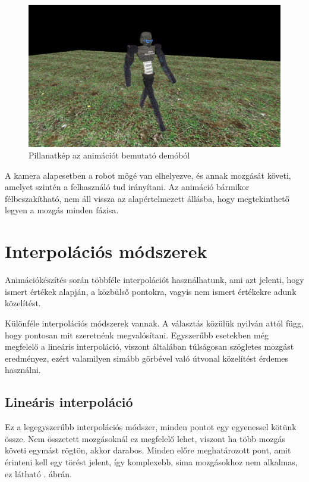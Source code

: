 \begin{figure}[h]
\centering
\includegraphics[scale=0.4]{kepek/animation_demo.png}
\caption[]{Pillanatkép az animációt bemutató demóból}
\label{fig:anim_demo}
\end{figure}

A kamera alapesetben a robot mögé van elhelyezve, és annak mozgását követi, amelyet szintén a felhasználó tud irányítani. Az animáció bármikor félbeszakítható, nem áll vissza az alapértelmezett állásba, hogy megtekinthető legyen a mozgás minden fázisa.

\section{Interpolációs módszerek}


Animációkészítés során többféle interpolációt használhatunk, ami azt jelenti, hogy ismert értékek alapján, a közbülső pontokra, vagyis nem ismert értékekre adunk közelítést.

Különféle interpolációs módszerek vannak. A választás közülük nyilván attól függ, hogy pontosan mit szeretnénk megvalósítani. Egyszerűbb esetekben még megfelelő a lineáris interpoláció, viszont általában túlságosan szögletes mozgást eredményez, ezért valamilyen simább görbével való útvonal közelítést érdemes használni.

\subsection{Lineáris interpoláció}

Ez a legegyszerűbb interpolációs módszer, minden pontot egy egyenessel kötünk össze. Nem összetett mozgásoknál ez megfelelő lehet, viszont ha több mozgás követi egymást rögtön, akkor darabos. Minden előre meghatározott pont, amit érinteni kell egy törést jelent, így komplexebb, sima mozgásokhoz nem alkalmas, ez látható . ábrán.


